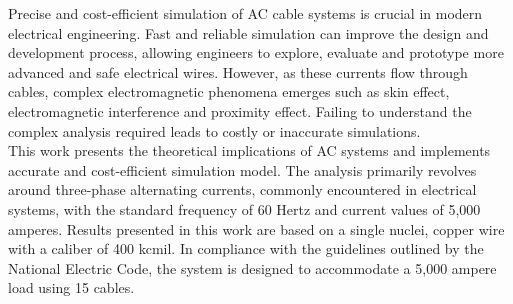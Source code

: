 \label{sec:INTRO}
Precise and cost-efficient simulation of AC cable systems is crucial in modern electrical engineering. Fast and reliable simulation can improve the design and development process, allowing engineers to explore, evaluate and prototype more advanced and safe electrical wires. However, as these currents flow through cables, complex electromagnetic phenomena emerges such as skin effect, electromagnetic interference and proximity effect. Failing to understand the complex analysis required leads to costly or inaccurate simulations. 
\\

This work presents the theoretical implications of AC systems and implements accurate and cost-efficient simulation model. The analysis primarily revolves around three-phase alternating currents, commonly encountered in electrical systems, with the standard frequency of 60 Hertz and current values of 5,000 amperes. Results presented in this work are based on a single nuclei, copper wire with a caliber of 400 kcmil. In compliance with the guidelines outlined by the National Electric Code, the system is designed to accommodate a 5,000 ampere load using 15 cables.
\\

